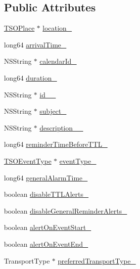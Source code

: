 \subsection*{Public Attributes}
\begin{DoxyCompactItemize}
\item 
\hyperlink{interface_t_s_o_place}{T\+S\+O\+Place} $\ast$ \hyperlink{interface_base_event_a7c8133029c1b40680a18f018f6cb37d8}{location\+\_\+}
\item 
long64 \hyperlink{interface_base_event_aa4f3ee06382da10b0682c75e41f15a27}{arrival\+Time\+\_\+}
\item 
N\+S\+String $\ast$ \hyperlink{interface_base_event_a8b076b0f0d3d0034957182ddc8f5a04e}{calendar\+Id\+\_\+}
\item 
long64 \hyperlink{interface_base_event_a096695f42ba508c550b5a8ec3f9b07ea}{duration\+\_\+}
\item 
N\+S\+String $\ast$ \hyperlink{interface_base_event_a3c192ced35381d10d483fba069102f2b}{id\+\_\+\+\_\+}
\item 
N\+S\+String $\ast$ \hyperlink{interface_base_event_a5afd766b21d39c0f158643038a694fed}{subject\+\_\+}
\item 
N\+S\+String $\ast$ \hyperlink{interface_base_event_ae0a6376ab05a24983deca22cd20861b9}{description\+\_\+\+\_\+}
\item 
long64 \hyperlink{interface_base_event_a22085a1f1df0d46b27ab2a859e4947be}{reminder\+Time\+Before\+T\+T\+L\+\_\+}
\item 
\hyperlink{interface_t_s_o_event_type}{T\+S\+O\+Event\+Type} $\ast$ \hyperlink{interface_base_event_a82014c3577aec81b69ecc4b7abdcc316}{event\+Type\+\_\+}
\item 
long64 \hyperlink{interface_base_event_af0eed092fc8508a8e3dfede3782c8133}{general\+Alarm\+Time\+\_\+}
\item 
boolean \hyperlink{interface_base_event_a65eaacb83b54ba467adebb354099d4b8}{disable\+T\+T\+L\+Alerts\+\_\+}
\item 
boolean \hyperlink{interface_base_event_abc90b83d98969a531e87ac598db8ec38}{disable\+General\+Reminder\+Alerts\+\_\+}
\item 
boolean \hyperlink{interface_base_event_a1a3d69f5009c3f0e783cb2b88cc3ae96}{alert\+On\+Event\+Start\+\_\+}
\item 
boolean \hyperlink{interface_base_event_a9c111ab0ab0caf03ea717e82f7eddffe}{alert\+On\+Event\+End\+\_\+}
\item 
Transport\+Type $\ast$ \hyperlink{interface_base_event_a4e5909f04ed95e1b62525e8103f4cf99}{preferred\+Transport\+Type\+\_\+}
\end{DoxyCompactItemize}


